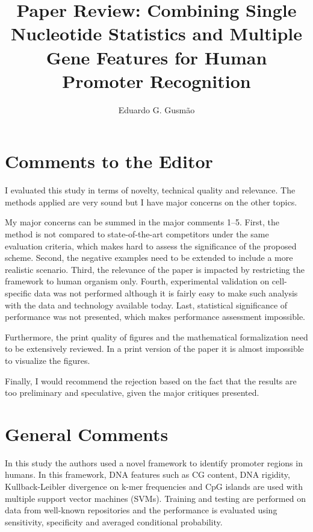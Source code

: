 \documentclass[11pt]{article}
\begin{document}
\title{Paper Review: Combining Single Nucleotide Statistics and Multiple Gene Features for Human Promoter Recognition} \date{}

\author{Eduardo G. Gusm\~{a}o}

\thispagestyle{empty}

\maketitle

\setlength{\parskip}{0.5cm}

\section{Comments to the Editor}

I evaluated this study in terms of novelty, technical quality and relevance. The methods applied are very sound but I have major concerns on the other topics.

My major concerns can be summed in the major comments 1--5. First, the method is not compared to state-of-the-art competitors under the same evaluation criteria, which makes hard to assess the significance of the proposed scheme. Second, the negative examples need to be extended to include a more realistic scenario. Third, the relevance of the paper is impacted by restricting the framework to human organism only. Fourth, experimental validation on cell-specific data was not performed although it is fairly easy to make such analysis with the data and technology available today. Last, statistical significance of performance was not presented, which makes performance assessment impossible.

Furthermore, the print quality of figures and the mathematical formalization need to be extensively reviewed. In a print version of the paper it is almost impossible to visualize the figures.

Finally, I would recommend the rejection based on the fact that the results are too preliminary and speculative, given the major critiques presented.

\section{General Comments}

In this study the authors used a novel framework to identify promoter regions in humans. In this framework, DNA features such as CG content, DNA rigidity, Kullback-Leibler divergence on k-mer frequencies and CpG islands are used with multiple support vector machines (SVMs). Training and testing are performed on data from well-known repositories and the performance is evaluated using sensitivity, specificity and averaged conditional probability.
\end{document}
